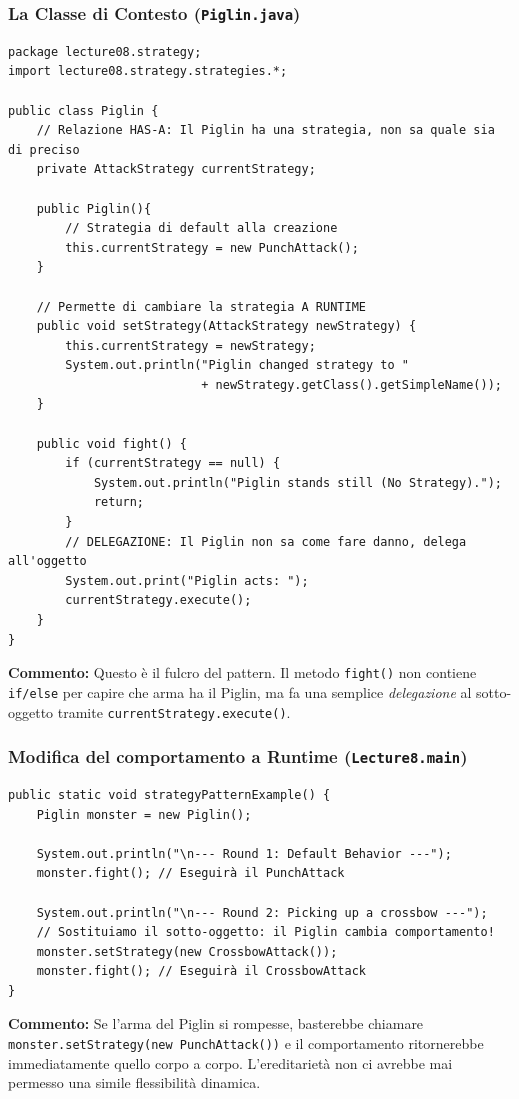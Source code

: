 \documentclass[12pt, a4paper]{article}
\begin{document}
\subsubsection{La Classe di Contesto (\texttt{Piglin.java})}
\begin{verbatim}
package lecture08.strategy;
import lecture08.strategy.strategies.*;

public class Piglin {
    // Relazione HAS-A: Il Piglin ha una strategia, non sa quale sia di preciso
    private AttackStrategy currentStrategy;

    public Piglin(){
        // Strategia di default alla creazione
        this.currentStrategy = new PunchAttack();
    }

    // Permette di cambiare la strategia A RUNTIME
    public void setStrategy(AttackStrategy newStrategy) {
        this.currentStrategy = newStrategy;
        System.out.println("Piglin changed strategy to " 
                           + newStrategy.getClass().getSimpleName());
    }

    public void fight() {
        if (currentStrategy == null) {
            System.out.println("Piglin stands still (No Strategy).");
            return;
        }
        // DELEGAZIONE: Il Piglin non sa come fare danno, delega all'oggetto
        System.out.print("Piglin acts: ");
        currentStrategy.execute();
    }
}
\end{verbatim}
\textbf{Commento:} Questo è il fulcro del pattern. Il metodo \texttt{fight()} non contiene \texttt{if/else} per capire che arma ha il Piglin, ma fa una semplice \textit{delegazione} al sotto-oggetto tramite \texttt{currentStrategy.execute()}.

\newpage

\subsubsection{Modifica del comportamento a Runtime (\texttt{Lecture8.main})}
\begin{verbatim}
public static void strategyPatternExample() {
    Piglin monster = new Piglin();

    System.out.println("\n--- Round 1: Default Behavior ---");
    monster.fight(); // Eseguirà il PunchAttack

    System.out.println("\n--- Round 2: Picking up a crossbow ---");
    // Sostituiamo il sotto-oggetto: il Piglin cambia comportamento!
    monster.setStrategy(new CrossbowAttack());
    monster.fight(); // Eseguirà il CrossbowAttack
}
\end{verbatim}
\textbf{Commento:} Se l'arma del Piglin si rompesse, basterebbe chiamare \\ \texttt{monster.setStrategy(new PunchAttack())} e il comportamento ritornerebbe immediatamente quello corpo a corpo. L'ereditarietà non ci avrebbe mai permesso una simile flessibilità dinamica.
\end{document}
